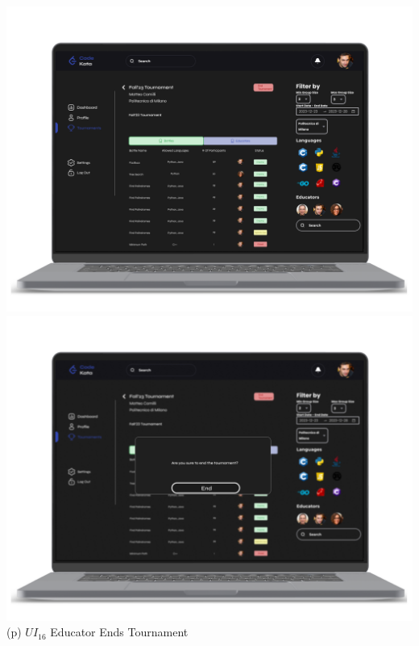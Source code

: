 \newpage
\begin{center}
\includegraphics[scale=0.13]{Images/ui-ux/educator_end_tournament.png}
\includegraphics[scale=0.13]{Images/ui-ux/educator_end_tournament_1.png}
        (p) $UI_{16}$  Educator Ends Tournament
\end{center}

